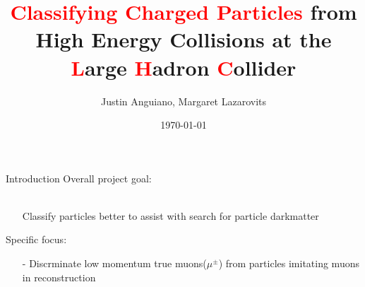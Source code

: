 \documentclass[10pt,handout]{beamer}
\author{Justin Anguiano, Margaret Lazarovits}
\title{\textcolor{red}{Classifying Charged Particles} from High Energy Collisions at the \textcolor{red}{L}arge \textcolor{red}{H}adron \textcolor{red}{C}ollider }
\institute{University of Kansas}
\date{\today}
\begin{document}
\begin{frame}
\titlepage
\end{frame}



\begin{frame}{Introduction}
Overall project goal:\\
\quad \quad \\
\begin{itemize}
\item[] Classify particles better to assist with search for particle
 darkmatter
\item[] \quad
\end{itemize}
Specific focus:
 \begin{itemize}
	
	\item[] \quad
	\item[-] Discrminate low momentum true muons($\mu^\pm$) from particles imitating muons in reconstruction
\end{itemize}


\end{frame}
\end{document}
